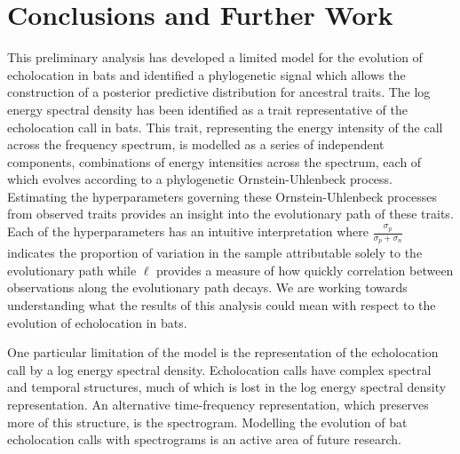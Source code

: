 \documentclass{ws-rv9x6}
\begin{document}
\section{Conclusions and Further Work}

This preliminary analysis has developed a limited model for the evolution of echolocation in bats and identified a phylogenetic signal which allows the construction of a posterior predictive distribution for ancestral traits. The log energy spectral density has been identified as a trait representative of the echolocation call in bats. This trait, representing the energy intensity of the call across the frequency spectrum, is modelled as a series of independent components, combinations of energy intensities across the spectrum, each of which evolves according to a phylogenetic Ornstein-Uhlenbeck process. Estimating the hyperparameters governing these Ornstein-Uhlenbeck processes from observed traits provides an insight into the evolutionary path of these traits. Each of the hyperparameters has an intuitive interpretation where \(\frac{\sigma_p}{\sigma_p + \sigma_n}\) indicates the proportion of variation in the sample attributable solely to the evolutionary path while \(\ell\) provides a measure of how quickly correlation between observations along the evolutionary path decays. We are working towards understanding what the results of this analysis could mean with respect to the evolution of echolocation in bats.

One particular limitation of the model is the representation of the echolocation call by a log energy spectral density. Echolocation calls have complex spectral and temporal structures, much of which is lost in the log energy spectral density representation. An alternative time-frequency representation, which preserves more of this structure, is the spectrogram. Modelling the evolution of bat echolocation calls with spectrograms is an active area of future research.




\end{document}
